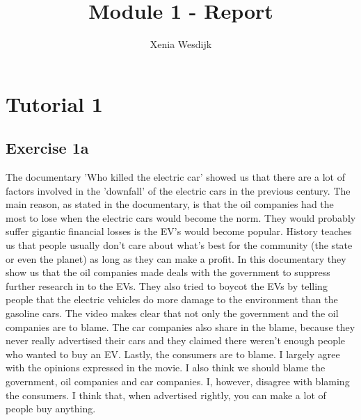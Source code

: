 \documentclass[final]{scrreprt} %
\title{Module 1 - Report}
\author{Xenia {Wesdijk}}
\begin{document}

\chapter{Tutorial 1}
\section{Exercise 1a} 
The documentary 'Who killed the electric car' showed us that there are a lot of factors involved in the 'downfall' of the electric cars in the previous century. The main reason, as stated in the documentary, is that the oil companies had the most to lose when the electric cars would become the norm. They would probably suffer gigantic financial losses is the EV's would become popular. History teaches us that people usually don't care about what's best for the community (the state or even the planet) as long as they can make a profit. In this documentary they show us that the oil companies made deals with the government to suppress further research in to the EVs. They also tried to boycot the EVs by telling people that the electric vehicles do more damage to the environment than the gasoline cars. 
The video makes clear that not only the government and the oil companies are to blame. The car companies also share in the blame, because they never really advertised their cars and they claimed there weren't enough people who wanted to buy an EV.
Lastly, the consumers are to blame. 
I largely agree with the opinions expressed in the movie. I also think we should blame the government, oil companies and car companies. I, however, disagree with blaming the consumers. I think that, when advertised rightly, you can make a lot of people buy anything.
\end{document}
